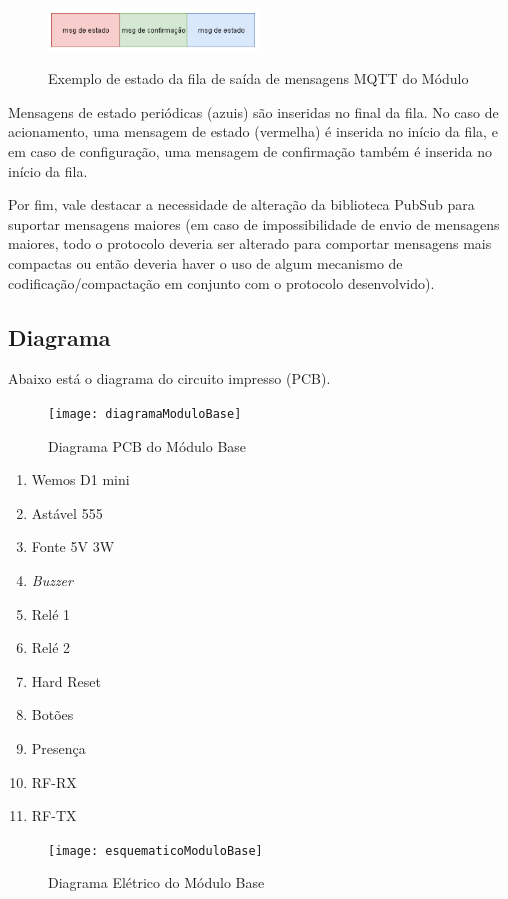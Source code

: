 \begin{figure}[H]
	\centering
	\caption{Exemplo de estado da fila de saída de mensagens MQTT do Módulo}
	\includegraphics[width=0.5\textwidth]{filasaidaMQTT}
	\label{fig:filasaidaMQTT}
\end{figure}

Mensagens de estado periódicas (azuis) são inseridas no final da fila.
No caso de acionamento, uma mensagem de estado (vermelha) é inserida no início da fila, e em caso de configuração, uma mensagem de confirmação também é inserida no início da fila.

Por fim, vale destacar a necessidade de alteração da biblioteca PubSub para suportar mensagens maiores (em caso de impossibilidade de envio de mensagens maiores, todo o protocolo deveria ser alterado para comportar mensagens mais compactas ou então deveria haver o uso de algum mecanismo de codificação/compactação em conjunto com o protocolo desenvolvido).

\subsection{Diagrama}
Abaixo está o diagrama do circuito impresso (PCB).

\begin{figure}[H]
	\centering
	\caption{Diagrama PCB do Módulo Base}
  \texttt{[image: diagramaModuloBase]}
\label{fig:diagramaModuloBase}
\end{figure}

\begin{enumerate}
\item Wemos D1 mini
\item Astável 555
\item Fonte 5V 3W
\item \textit{Buzzer}
\item Relé 1
\item Relé 2
\item Hard Reset
\item Botões
\item Presença
\item RF-RX
\item RF-TX
\end{enumerate}

\begin{figure}[H]
	\centering
	\caption{Diagrama Elétrico do Módulo Base}
  \texttt{[image: esquematicoModuloBase]}
\label{fig:esquematicoModuloBase}
\end{figure}

